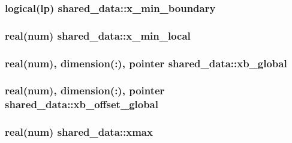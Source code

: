 \subsubsection[{\texorpdfstring{x\+\_\+min\+\_\+boundary}{x_min_boundary}}]{\setlength{\rightskip}{0pt plus 5cm}logical(lp) shared\+\_\+data\+::x\+\_\+min\+\_\+boundary}\hypertarget{namespaceshared__data_a016aabf832acc2511d767d2736e9ce95}{}\label{namespaceshared__data_a016aabf832acc2511d767d2736e9ce95}
\subsubsection[{\texorpdfstring{x\+\_\+min\+\_\+local}{x_min_local}}]{\setlength{\rightskip}{0pt plus 5cm}real(num) shared\+\_\+data\+::x\+\_\+min\+\_\+local}\hypertarget{namespaceshared__data_a4a7c4b6eb045c3017f04dc08eb5cddcd}{}\label{namespaceshared__data_a4a7c4b6eb045c3017f04dc08eb5cddcd}
\subsubsection[{\texorpdfstring{xb\+\_\+global}{xb_global}}]{\setlength{\rightskip}{0pt plus 5cm}real(num), dimension(\+:), pointer shared\+\_\+data\+::xb\+\_\+global}\hypertarget{namespaceshared__data_a22e4d784058444556c04be431d584ec7}{}\label{namespaceshared__data_a22e4d784058444556c04be431d584ec7}
\subsubsection[{\texorpdfstring{xb\+\_\+offset\+\_\+global}{xb_offset_global}}]{\setlength{\rightskip}{0pt plus 5cm}real(num), dimension(\+:), pointer shared\+\_\+data\+::xb\+\_\+offset\+\_\+global}\hypertarget{namespaceshared__data_a5fe1885535a9b60b53e19525797f551a}{}\label{namespaceshared__data_a5fe1885535a9b60b53e19525797f551a}
\subsubsection[{\texorpdfstring{xmax}{xmax}}]{\setlength{\rightskip}{0pt plus 5cm}real(num) shared\+\_\+data\+::xmax}\hypertarget{namespaceshared__data_abf7145e6fa97e6f2650f0c09c8818b58}{}\label{namespaceshared__data_abf7145e6fa97e6f2650f0c09c8818b58}
